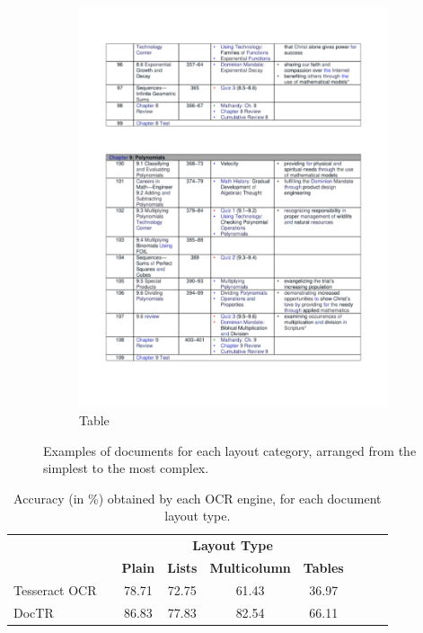 \begin{figure}
\begin{subfigure}[b]{0.24\textwidth}
        \includegraphics[width=\textwidth]{images/chapter4/tables.pdf}
        \caption{Table}
      \end{subfigure}
    \caption{Examples of documents for each layout category, arranged from the simplest to the most complex.}
    \label{fig:layout-examples}
\end{figure}

\begin{table}
  \centering
  \small
  \begin{adjustbox}{max width=\textwidth}
  \begin{threeparttable}
  \begin{tabular}{lcccccccc}
      \toprule
          & & \multicolumn{4}{c}{\textbf{Layout Type}} & \\
          & & \textbf{Plain} & \textbf{Lists} & \textbf{Multicolumn} & \textbf{Tables}\\
      \midrule
      Tesseract OCR \citep{kay2007tesseract} & & 78.71 & 72.75 & 61.43 & 36.97 \\
      DocTR \citep{doctr2021} & & 86.83 & 77.83 & 82.54 & 66.11 \\
  \bottomrule
  \end{tabular}
  \end{threeparttable}
  \end{adjustbox}
  \caption{Accuracy (in \%) obtained by each \ac{OCR} engine, for each document layout type.}
  \label{table:ocr-preliminary-experiments}
\end{table}

